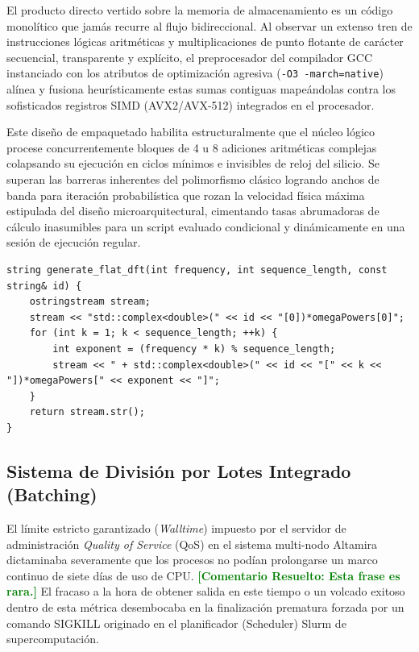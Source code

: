 \documentclass[12pt,a4paper]{tfg_domingo}
\newcommand{\ComentarioR}[1]{\textcolor{green}{\textbf{[Comentario Resuelto:
#1]}}}
\begin{document}
El producto directo vertido sobre la memoria de almacenamiento es un código monolítico que jamás recurre al flujo bidireccional. Al observar un extenso tren de instrucciones lógicas aritméticas y multiplicaciones de punto flotante de carácter secuencial, transparente y explícito, el preprocesador del compilador GCC instanciado con los atributos de optimización agresiva (\texttt{-O3 -march=native}) alínea y fusiona heurísticamente estas sumas contiguas mapeándolas contra los sofisticados registros SIMD (AVX2/AVX-512) integrados en el procesador. 

Este diseño de empaquetado habilita estructuralmente que el núcleo lógico procese concurrentemente bloques de 4 u 8 adiciones aritméticas complejas colapsando su ejecución en ciclos mínimos e invisibles de reloj del silicio. Se superan las barreras inherentes del polimorfismo clásico logrando anchos de banda para iteración probabilística que rozan la velocidad física máxima estipulada del diseño microarquitectural, cimentando tasas abrumadoras de cálculo inasumibles para un script evaluado condicional y dinámicamente en una sesión de ejecución regular.

\begin{lstlisting}[caption={Rutina generadora algorítmica inyectando sentencias operacionales y sumatorias monolíticas directas en el archivo fuente de extensión C++ destino}, label={lst:unrolled_dft_gen}]
string generate_flat_dft(int frequency, int sequence_length, const string& id) {
    ostringstream stream;
    stream << "std::complex<double>(" << id << "[0])*omegaPowers[0]";
    for (int k = 1; k < sequence_length; ++k) {
        int exponent = (frequency * k) % sequence_length;
        stream << " + std::complex<double>(" << id << "[" << k << "])*omegaPowers[" << exponent << "]";
    }
    return stream.str();
}
\end{lstlisting}

\subsection{Sistema de División por Lotes Integrado (Batching)}
El límite estricto garantizado (\emph{Walltime}) impuesto por el servidor de administración \emph{Quality of Service} (QoS) en el sistema multi-nodo Altamira dictaminaba severamente que los procesos no podían prolongarse un marco continuo de siete días de uso de CPU. \ComentarioR{Esta frase es rara.}
El fracaso a la hora de obtener salida en este tiempo o un volcado exitoso dentro de esta métrica desembocaba en la finalización prematura forzada por un comando SIGKILL originado en el planificador (Scheduler) Slurm de supercomputación.
\end{document}

